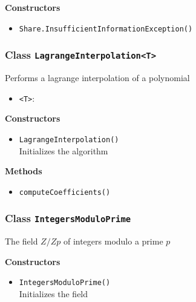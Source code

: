 \textbf{Constructors}
\begin{itemize}
\item \lstinline|Share.InsufficientInformationException()| \\


\end{itemize}


\subsubsection{Class \lstinline|LagrangeInterpolation<T>|}
Performs a lagrange interpolation of a polynomial
\begin{itemize}
\item \lstinline|<T>|: 
\end{itemize}

\textbf{Constructors}
\begin{itemize}
\item \lstinline|LagrangeInterpolation()| \\
Initializes the algorithm

\end{itemize}

\textbf{Methods}
\begin{itemize}
\item \lstinline|computeCoefficients()| \\


\end{itemize}

\subsubsection{Class \lstinline|IntegersModuloPrime|}
The field $Z/Zp$ of integers modulo a prime $p$

\textbf{Constructors}
\begin{itemize}
\item \lstinline|IntegersModuloPrime()| \\
Initializes the field

\end{itemize}

